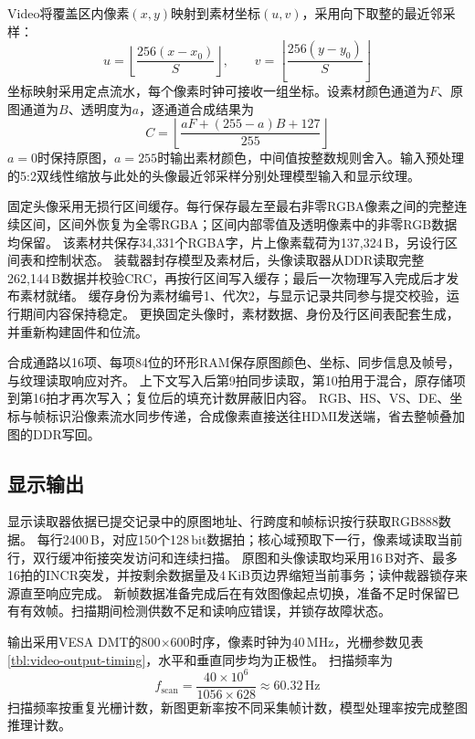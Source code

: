Video将覆盖区内像素$(x,y)$映射到素材坐标$(u,v)$，采用向下取整的最近邻采样：
\[
u=\left\lfloor\frac{256(x-x_0)}{S}\right\rfloor,\qquad
v=\left\lfloor\frac{256(y-y_0)}{S}\right\rfloor
\]
坐标映射采用定点流水，每个像素时钟可接收一组坐标。设素材颜色通道为$F$、原图通道为$B$、透明度为$a$，逐通道合成结果为
\[
C=\left\lfloor\frac{aF+(255-a)B+127}{255}\right\rfloor
\]
$a=0$时保持原图，$a=255$时输出素材颜色，中间值按整数规则舍入。输入预处理的5:2双线性缩放与此处的头像最近邻采样分别处理模型输入和显示纹理。

固定头像采用无损行区间缓存。每行保存最左至最右非零RGBA像素之间的完整连续区间，区间外恢复为全零RGBA；区间内部零值及透明像素中的非零RGB数据均保留。
该素材共保存34,331个RGBA字，片上像素载荷为137,324\,B，另设行区间表和控制状态。
装载器封存模型及素材后，头像读取器从DDR读取完整262,144\,B数据并校验CRC，再按行区间写入缓存；最后一次物理写入完成后才发布素材就绪。
缓存身份为素材编号1、代次2，与显示记录共同参与提交校验，运行期间内容保持稳定。
更换固定头像时，素材数据、身份及行区间表配套生成，并重新构建固件和位流。

合成通路以16项、每项84位的环形RAM保存原图颜色、坐标、同步信息及帧号，与纹理读取响应对齐。
上下文写入后第9拍同步读取，第10拍用于混合，原存储项到第16拍才再次写入；复位后的填充计数屏蔽旧内容。
RGB、HS、VS、DE、坐标与帧标识沿像素流水同步传递，合成像素直接送往HDMI发送端，省去整帧叠加图的DDR写回。

\subsection{显示输出}

显示读取器依据已提交记录中的原图地址、行跨度和帧标识按行获取RGB888数据。
每行2400\,B，对应150个128\,bit数据拍；核心域预取下一行，像素域读取当前行，双行缓冲衔接突发访问和连续扫描。
原图和头像读取均采用16\,B对齐、最多16拍的INCR突发，并按剩余数据量及4\,KiB页边界缩短当前事务；读仲裁器锁存来源直至响应完成。
新帧数据准备完成后在有效图像起点切换，准备不足时保留已有有效帧。扫描期间检测供数不足和读响应错误，并锁存故障状态。

输出采用VESA DMT的800$\times$600时序\cite{vesa-dmt-2008}，像素时钟为40\,MHz，光栅参数见表\ref{tbl:video-output-timing}，水平和垂直同步均为正极性。
扫描频率为
\[
f_{\mathrm{scan}}=\frac{40\times10^6}{1056\times628}\approx60.32\,\mathrm{Hz}
\]
扫描频率按重复光栅计数，新图更新率按不同采集帧计数，模型处理率按完成整图推理计数。

